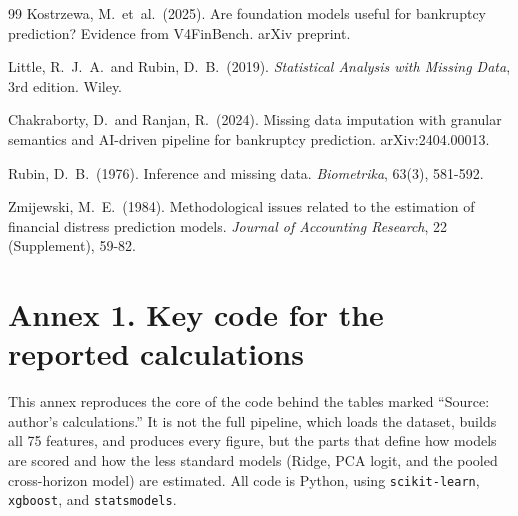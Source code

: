 \documentclass[12pt,a4paper]{article}
\begin{document}
\begin{thebibliography}{99}
Kostrzewa, M.\ et~al.\ (2025).
\newblock Are foundation models useful for bankruptcy prediction? Evidence from
V4FinBench.
\newblock arXiv preprint.

Little, R.\ J.\ A.\ and Rubin, D.\ B.\ (2019).
\newblock \textit{Statistical Analysis with Missing Data}, 3rd edition.
\newblock Wiley.

Chakraborty, D.\ and Ranjan, R.\ (2024).
\newblock Missing data imputation with granular semantics and AI-driven
pipeline for bankruptcy prediction.
\newblock arXiv:2404.00013.

Rubin, D.\ B.\ (1976).
\newblock Inference and missing data.
\newblock \textit{Biometrika}, 63(3), 581-592.

Zmijewski, M.\ E.\ (1984).
\newblock Methodological issues related to the estimation of financial
distress prediction models.
\newblock \textit{Journal of Accounting Research}, 22 (Supplement), 59-82.

\end{thebibliography}

\clearpage
\appendix
\section*{Annex 1. Key code for the reported calculations}
\label{sec:appendix-code}

This annex reproduces the core of the code behind the tables marked ``Source:
author's calculations.'' It is not the full pipeline, which loads the dataset,
builds all 75 features, and produces every figure, but the parts that define
how models are scored and how the less standard models (Ridge, PCA logit, and
the pooled cross-horizon model) are estimated. All code is Python, using
\texttt{scikit-learn}, \texttt{xgboost}, and \texttt{statsmodels}.

\begin{center}
\end{center}
\end{document}

